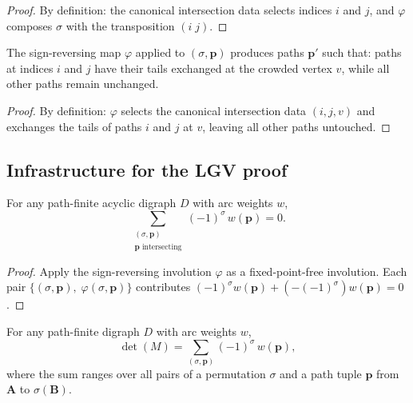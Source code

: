 \begin{proof}
\leanok
By definition: the canonical intersection data selects indices $i$ and $j$,
and $\varphi$ composes $\sigma$ with the transposition $(i\; j)$.
\end{proof}

\begin{lemma}
\label{lem.lgv.signReversing.paths}
\leanhelper
\leanok
The sign-reversing map $\varphi$ applied to $(\sigma, \mathbf{p})$
produces paths $\mathbf{p}'$ such that: paths at indices $i$ and $j$
have their tails exchanged at the crowded vertex $v$, while all other
paths remain unchanged.
\end{lemma}

\begin{proof}
\leanok
By definition: $\varphi$ selects the canonical intersection data
$(i, j, v)$ and exchanges the tails of paths
$i$ and $j$ at $v$, leaving all other paths untouched.
\end{proof}

\subsection{Infrastructure for the LGV proof}

\begin{lemma}
\label{lem.lgv.sum-ipat-zero}
\leanhelper
\leanok
For any path-finite acyclic digraph $D$ with arc weights $w$,
\[
  \sum_{\substack{(\sigma, \mathbf{p}) \\ \mathbf{p} \text{ intersecting}}}
  (-1)^\sigma \, w(\mathbf{p}) = 0.
\]
\end{lemma}

\begin{proof}
Apply the sign-reversing involution $\varphi$ as a fixed-point-free involution.
Each pair $\{(\sigma, \mathbf{p}),\; \varphi(\sigma, \mathbf{p})\}$
contributes $(-1)^\sigma w(\mathbf{p}) + (-(-1)^\sigma) w(\mathbf{p}) = 0$.
\end{proof}

\begin{lemma}
\label{lem.lgv.det-eq-sum-all}
\leanhelper
\leanok
For any path-finite digraph $D$ with arc weights $w$,
\[
  \det(M) = \sum_{(\sigma, \mathbf{p})} (-1)^\sigma \, w(\mathbf{p}),
\]
where the sum ranges over all pairs of a permutation $\sigma$ and a
path tuple $\mathbf{p}$ from $\mathbf{A}$ to $\sigma(\mathbf{B})$.
\end{lemma}

